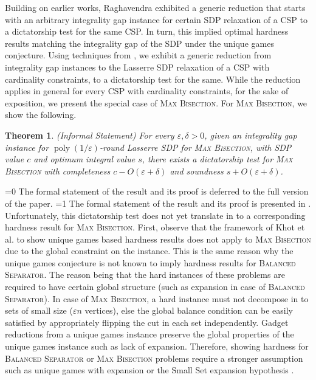 \documentclass[11pt]{article}
\def\full{1}
\newtheorem{theorem}{Theorem}[section]
\theoremstyle{definition}
\DeclareMathOperator{\poly}{poly}
\newcommand{\etal}{et al.\xspace}
\newcommand{\problemmacro}[1]{\texorpdfstring{\textsc{#1}}{#1}\xspace}
\newcommand{\balancedseparator}{\problemmacro{Balanced Separator}}
\newcommand{\maxbisection}{\problemmacro{Max Bisection}}
\let\epsilon=\varepsilon
\numberwithin{equation}{section}
\let\pref=\prettyref
\begin{document}
Building on earlier works, Raghavendra \cite{Raghavendra08} exhibited
a generic reduction that starts with an arbitrary integrality gap
instance for certain SDP relaxation of a CSP to a dictatorship test for the same CSP.
In turn, this implied optimal hardness results matching the
integrality gap of the SDP under the unique games conjecture.
Using techniques from \cite{Raghavendra08}, we exhibit a generic
reduction from integrality gap instances to the Lasserre SDP
relaxation of a CSP with cardinality constraints, to a dictatorship
test for the same.  While the reduction applies in general for every
CSP with cardinality constraints, for the sake of exposition, we
present the special case of \maxbisection.  For \maxbisection, we show
the following.
\begin{theorem}(Informal Statement)
For every $\epsilon,\delta > 0$, given an integrality gap instance for
$\poly(1/\epsilon)$-round Lasserre SDP for \maxbisection, with SDP
value $c$ and optimum integral value $s$, there exists a dictatorship
test for \maxbisection with completeness $c - O(\epsilon+\delta)$ and
soundness $s + O(\epsilon+\delta)$.
\end{theorem}
\ifnum\full=0
The formal statement of the result and its proof is deferred to the
full version of the paper.
\fi
\ifnum\full=1
The formal statement of the result  and its proof is presented in
\pref{sec:gaptodict}.
\fi
Unfortunately, this dictatorship test does not yet translate in to a
corresponding hardness result for \maxbisection.
First, observe that the framework of Khot \etal \cite{KhotKMO07} to
show unique games based hardness results does not apply to
\maxbisection due to the global constraint on the instance.
This is the same reason why the unique games conjecture is not known to imply
hardness results for \balancedseparator.   The reason being that the hard instances of these problems are
required to have certain global structure (such as expansion in case of
\balancedseparator).  In case of \maxbisection, a hard instance must
not decompose in to sets of small size ($\epsilon n$ vertices), else
the global balance condition can be easily satisfied by appropriately
flipping the cut in each set independently.  Gadget reductions from a unique games instance
preserve the global properties of the unique games instance such as lack of expansion. Therefore, showing
hardness for \balancedseparator or \maxbisection problems require a
stronger assumption such as unique games with expansion or the Small
Set expansion hypothesis \cite{RaghavendraS10}.
\end{document}
